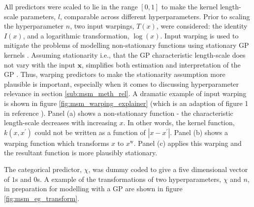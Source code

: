 All predictors were scaled to lie in the range $[0, 1]$ to make the kernel length-scale parameters, $l$, comparable across different hyperparameters. Prior to scaling the hyperparameter $n$, two input warpings, $T(x)$, were considered: the identity $I(x)$, and a logarithmic transformation, $\log(x)$.  Input warping is used to mitigate the problems of modelling non-stationary functions using stationary GP kernels \cite{snoekInputWarpingBayesian2014a}. Assuming stationarity i.e., that the GP characteristic length-scale  does not vary with the input $\mathbf{x}$, simplifies both estimation and interpretation of the GP \cite{snoekInputWarpingBayesian2014a}. Thus, warping predictors to make the stationarity assumption more plausible is important, especially when it comes to discussing hyperparameter relevance in section \ref{sub:msm_meth_rel}. A dramatic example of input warping is shown in figure \ref{fig:msm_warping_explainer} (which is an adaption of figure 1 in reference \cite{snoekInputWarpingBayesian2014a}). Panel (a) shows a non-stationary function - the characteristic length-scale decreases with increasing $x$. In other words, the kernel function, $k(x, x^{\prime})$ could not be written as a function of $|x-x^{\prime}|$. Panel (b) shows a warping function which transforms $x$ to $x^{\mathrm{w}}$. Panel (c) applies this warping and the resultant function is more plausibly stationary. 

The categorical predictor, $\chi$, was dummy coded \cite{dalyDummyCodingVs2016} to give a five dimensional vector of $1$s and $0$s.  A example of the transformations of two hyperparameters, $\chi$ and $n$, in preparation for modelling with a GP are shown in figure \ref{fig:msm_eg_transform}. 

